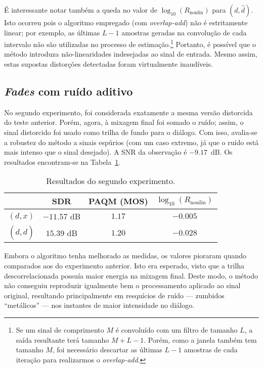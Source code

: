 É interessante notar também a queda no valor de $\log_{10} (R_{\text{nonlin}})$ para $(d, \hat{d})$. Isto ocorreu pois o algoritmo empregado (com \textit{overlap-add}) não é estritamente linear; por exemplo, as últimas $L - 1$ amostras geradas na convolução de cada intervalo não são utilizadas no processo de estimação.\footnote{Se um sinal de comprimento $M$ é convoluído com um filtro de tamanho $L$, a saída resultante terá tamanho $M+L-1$. Porém, como a janela também tem tamanho $M$, foi necessário descartar as últimas $L-1$ amostras de cada iteração para realizarmos o \textit{overlap-add}.} Portanto, é possível que o método introduza não-linearidades indesejadas ao sinal de entrada. Mesmo assim, estas supostas distorções detectadas foram virtualmente inaudíveis.

\subsection{\textit{Fades} com ruído aditivo}
\label{subsec:wiener:experiment-2}

No segundo experimento, foi considerada exatamente a mesma versão distorcida do teste anterior. Porém, agora, à mixagem final foi somado o ruído; assim, o sinal distorcido foi usado como trilha de fundo para o diálogo. Com isso, avalia-se a robustez do método a sinais espúrios (com um caso extremo, já que o ruído está mais intenso que o sinal desejado). A SNR da observação é $-9.17$~dB. Os resultados encontram-se na Tabela~\ref{tab:wf:experiment-2}.
{\def\arraystretch{1.25}\tabcolsep=10pt
\begin{table}[!ht]
    \centering
    \caption[Resultados do segundo experimento: \textit{fades} com ruído aditivo]{Resultados do segundo experimento.}
    \label{tab:wf:experiment-2}
    \begin{tabular}{cccc}
        \toprule
                         & SDR        & PAQM (MOS)  & $\log_{10}(R_{\text{nonlin}})$ \\
        \midrule
        $(d, x)$       & $-11.57$ dB & $1.17$  & $-0.005$                 \\
        $(d, \hat{d})$ & $15.39$ dB & $1.20$   & $-0.028$                \\ \bottomrule
    \end{tabular}
\end{table}
}

Embora o algoritmo tenha melhorado as medidas, os valores pioraram quando comparados aos do experimento anterior. Isto era esperado, visto que a trilha descorrelacionada possuía maior energia na mixagem final. Deste modo, o método não conseguiu reproduzir igualmente bem o processamento aplicado ao sinal original, resultando principalmente em resquícios de ruído --- zumbidos ``metálicos'' --- nos instantes de maior intensidade no diálogo.

